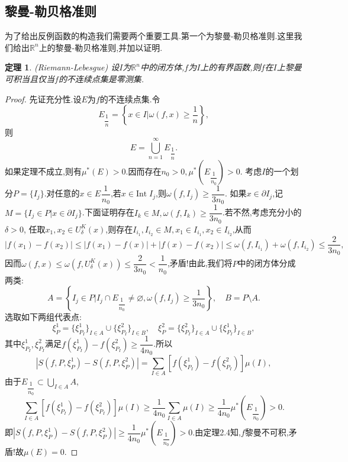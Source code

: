 \documentclass[a4paper,12pt]{article}
\newtheorem{theorem}{定理}[section]
\begin{document}
{            \subsection{黎曼-勒贝格准则}
            为了给出反例函数的构造我们需要两个重要工具.第一个为黎曼-勒贝格准则.这里我们给出$\mathbb{R}^n$上的黎曼-勒贝格准则,并加以证明.
            \begin{theorem}{\emph{(Riemann-Lebesgue)}}
                设$I$为$\mathbb{R}^n$中的闭方体,$f$为$I$上的有界函数,则$f$在$I$上黎曼可积当且仅当$f$的不连续点集是零测集.
            \end{theorem}
            \begin{proof}
                先证充分性.设$E$为$f$的不连续点集.令$$E_{\dfrac{1}{n}}=\left\{x\in I|\omega(f,x)\geqslant\dfrac{1}{n}\right\},$$
                则$$E=\bigcup_{n=1}^\infty E_{\dfrac{1}{n}}.$$
                如果定理不成立,则有$\mu^*(E)>0$.因而存在$n_0>0,\mu^*(E_{\dfrac{1}{n_0}})>0$.
                考虑$I$的一个划分$P=\{I_j\}$.对任意的$x\in E_{}\dfrac{1}{n_0}$,若$x\in \mathrm{Int}\; I_j$,则$\omega(f,I_j)\geqslant\dfrac{1}{3n_0}$.
                如果$x\in\partial I_j$,记$M=\{I_j\in P|x\in\partial I_j\}$.下面证明存在$I_k\in M,\omega(f,I_k)\geqslant\dfrac{1}{3n_0}$.若不然,考虑充分小的$\delta>0$,
                任取$x_1,x_2\in U_\delta^K(x)$,则存在$I_{i_1},I_{i_2}\in M,x_1\in I_{i_1},x_2\in I_{i_2}$,从而
                $$|f(x_1)-f(x_2)|\leqslant|f(x_1)-f(x)|+|f(x)-f(x_2)|\leqslant\omega(f,I_{i_1})+\omega(f,I_{i_2})\leqslant\dfrac{2}{3n_0},$$
                因而$\omega(f,x)\leqslant\omega(f,U_\delta^K(x))\leqslant\dfrac{2}{3n_0}<\dfrac{1}{n_0}$,矛盾!由此,我们将$P$中的闭方体分成两类:
                $$A=\left\{I_j\in P|I_j\cap E_{\dfrac{1}{n_0}}\not=\varnothing,\omega(f,I_j)\geqslant\dfrac{1}{3n_0}\right\},\quad B=P\setminus A.$$
                选取如下两组代表点:$$\xi_P^1=\{\xi_{P_I}^1\}_{I\in A}\cup\{\xi_{P_I}^2\}_{I\in B},\quad \xi_P^2=\{\xi_{P_I}^2\}_{I\in A}\cup\{\xi_{P_I}^1\}_{I\in B},$$
                其中$\xi_{P_I}^1,\xi_{P_I}^2$满足$f(\xi_{P_I}^1)-f(\xi_{P_I}^2)\geqslant\dfrac{1}{4n_0}$.所以
                $$|S(f,P,\xi_P^1)-S(f,P,\xi_P^2)|=\sum_{I\in A}[f(\xi_{P_I}^1)-f(\xi_{P_I}^2)]\mu(I),$$
                由于$E_{\dfrac{1}{n_0}}\subset\bigcup_{I\in A}A$,
                $$\sum_{I\in A}[f(\xi_{P_I}^1)-f(\xi_{P_I}^2)]\mu(I)\geqslant\dfrac{1}{4n_0}\sum_{I\in A}\mu(I)\geqslant \dfrac{1}{4n_0}\mu^*(E_{\dfrac{1}{n_0}})>0.$$
                即$|S(f,P,\xi_P^1)-S(f,P,\xi_P^2)|\geqslant\dfrac{1}{4n_0}\mu^*(E_{\dfrac{1}{n_0}})>0$.由定理2.4知,$f$黎曼不可积,矛盾!故$\mu(E)=0$.


\end{proof}}
\end{document}
